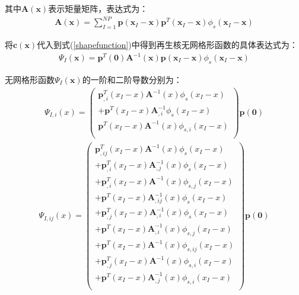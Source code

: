 其中$\pmb{A}(\pmb{x})$表示矩量矩阵，表达式为：
\begin{equation}
\begin{split}
    \pmb{A}(\pmb{x})=\sum_{I=1}^{N\!P}\pmb{p}(\pmb{x}_I-\pmb{x})\pmb{p}^T(\pmb{x}_I-\pmb{x})\phi_s(\pmb{x}_I-\pmb{x})
\end{split}
\end{equation}\par
将$\pmb{c}(\pmb{x})$代入到式(\ref{shapefunction})中得到再生核无网格形函数的具体表达式为：
\begin{equation}\label{Pshapefunction}
\begin{split}
    \Psi_I(\pmb{x})=\pmb{p}^T(\pmb{0})\pmb{A}^{-1}(\pmb{x})\pmb{p}(\pmb{x}_I-\pmb{x})\phi_s(\pmb{x}_I-\pmb{x})
\end{split}
\end{equation}\par
无网格形函数$\Psi_I(\pmb{x})$的一阶和二阶导数分别为：
\begin{equation}
\begin{split}
    \Psi_{I,i}(x)=\left(\begin{matrix}
    \pmb p_{,i}^{T}(x_I-x)\pmb A^{-1}(x)\phi_s(x_I-x)\\
    +\pmb p^{T}(x_I-x)\pmb A_{,i}^{-1}\phi_s(x_I-x)\\
    \pmb p^{T}(x_I-x)\pmb A^{-1}(x)\phi _{s,i}(x_I-x)\\
    \end{matrix}\right)
    \pmb p(\pmb 0)
\end{split}
\end{equation}
\begin{equation}
\begin{split}
    \Psi_{I,ij}(x)=\left(\begin{matrix}
    \pmb p_{,ij}^{T}(x_I-x)\pmb A^{-1}(x)\phi_s(x_I-x)\\
    +\pmb p_{,i}^{T}(x_I-x)\pmb A_{,j}^{-1}(x)\phi_s(x_I-x)\\
    +\pmb p_{,i}^{T}(x_I-x)\pmb A^{-1}(x)\phi_{s,j}(x_I-x)\\
    +\pmb p^{T}(x_I-x)\pmb A_{,ij}^{-1}(x)\phi_s(x_I-x)\\
    +\pmb p_{,j}^{T}(x_I-x)\pmb A_{,i}^{-1}(x)\phi_s(x_I-x)\\
    +\pmb p^{T}(x_I-x)\pmb A_{,i}^{-1}(x)\phi_{s,j}(x_I-x)\\
    +\pmb p^{T}(x_I-x)\pmb A^{-1}(x)\phi_{s,ij}(x_I-x)\\
    +\pmb p_{,j}^{T}(x_I-x)\pmb A^{-1}(x)\phi_{s,i}(x_I-x)\\
    +\pmb p^{T}(x_I-x)\pmb A_{,j}^{-1}(x)\phi_{s,i}(x_I-x)\\
    \end{matrix}\right)
    \pmb p(\pmb 0)
\end{split}
\end{equation}

